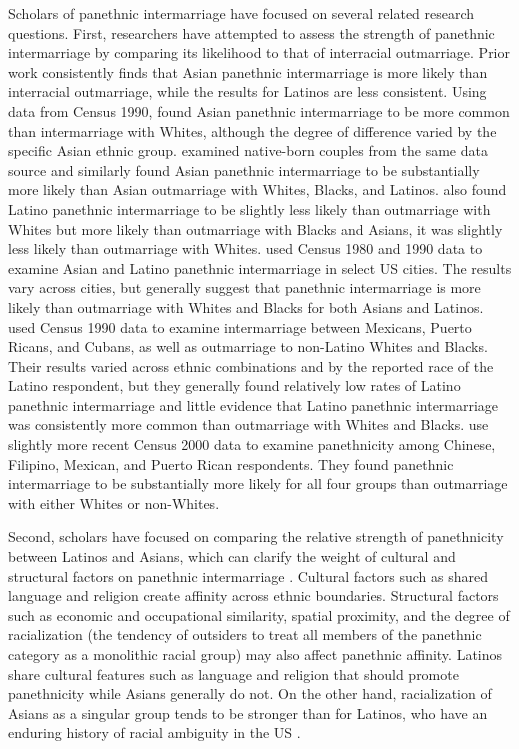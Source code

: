 \documentclass[11pt,]{article}
\begin{document}
Scholars of panethnic intermarriage have focused on several related research questions. First, researchers have attempted to assess the strength of panethnic intermarriage by comparing its likelihood to that of interracial outmarriage. Prior work consistently finds that Asian panethnic intermarriage is more likely than interracial outmarriage, while the results for Latinos are less consistent. Using data from Census 1990, \citet{qian_asian_2001} found Asian panethnic intermarriage to be more common than intermarriage with Whites, although the degree of difference varied by the specific Asian ethnic group. \citet{fu_how_2007a} examined native-born couples from the same data source and similarly found Asian panethnic intermarriage to be substantially more likely than Asian outmarriage with Whites, Blacks, and Latinos. \citet{fu_how_2007a} also found Latino panethnic intermarriage to be slightly less likely than outmarriage with Whites but more likely than outmarriage with Blacks and Asians, it was slightly less likely than outmarriage with Whites. \citet{rosenfeld_salience_2001} used Census 1980 and 1990 data to examine Asian and Latino panethnic intermarriage in select US cities. The results vary across cities, but generally suggest that panethnic intermarriage is more likely than outmarriage with Whites and Blacks for both Asians and Latinos. \citet{qian_latinos_2004} used Census 1990 data to examine intermarriage between Mexicans, Puerto Ricans, and Cubans, as well as outmarriage to non-Latino Whites and Blacks. Their results varied across ethnic combinations and by the reported race of the Latino respondent, but they generally found relatively low rates of Latino panethnic intermarriage and little evidence that Latino panethnic intermarriage was consistently more common than outmarriage with Whites and Blacks. \citet{qian_crossing_2012} use slightly more recent Census 2000 data to examine panethnicity among Chinese, Filipino, Mexican, and Puerto Rican respondents. They found panethnic intermarriage to be substantially more likely for all four groups than outmarriage with either Whites or non-Whites.

Second, scholars have focused on comparing the relative strength of panethnicity between Latinos and Asians, which can clarify the weight of cultural and structural factors on panethnic intermarriage \citep{lopez_panethnicity_1990}. Cultural factors such as shared language and religion create affinity across ethnic boundaries. Structural factors such as economic and occupational similarity, spatial proximity, and the degree of racialization (the tendency of outsiders to treat all members of the panethnic category as a monolithic racial group) may also affect panethnic affinity. Latinos share cultural features such as language and religion that should promote panethnicity while Asians generally do not. On the other hand, racialization of Asians as a singular group tends to be stronger than for Latinos, who have an enduring history of racial ambiguity in the US \citep{lopez_panethnicity_1990, kibria_construction_1997, rodriguez_changing_2000a, fox_defining_2013}.
\end{document}
